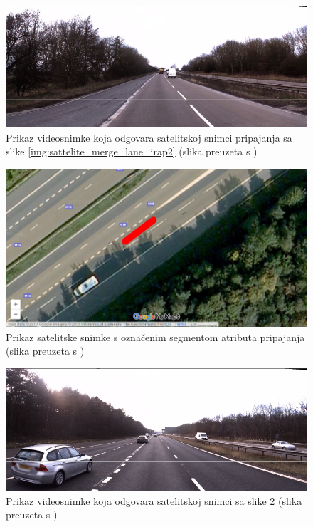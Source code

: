 \documentclass[times, utf8, diplomski, numeric]{fer}
\begin{document}
\begin{figure}[H]
\centering
\includegraphics[scale=0.5]{images/video_merge_lane_irap2.png}
\caption{Prikaz videosnimke koja odgovara satelitskoj snimci pripajanja sa slike \ref{img:sattelite_merge_lane_irap2} (slika preuzeta s \citep{url:ftts_irap})}
\label{img:video_merge_lane_irap2}
\end{figure}

\begin{figure}[H]
\centering
\includegraphics[scale=0.35]{images/sattelite_merge_lane_irap3.png}
\caption{Prikaz satelitske snimke s označenim segmentom atributa pripajanja (slika preuzeta s \citep{url:google_maps})}
\label{img:sattelite_merge_lane_irap3}
\end{figure}

\begin{figure}[H]
\centering
\includegraphics[scale=0.5]{images/video_merge_lane_irap3.png}
\caption{Prikaz videosnimke koja odgovara satelitskoj snimci sa slike \ref{img:sattelite_merge_lane_irap3} (slika preuzeta s \citep{url:ftts_irap})}
\label{img:video_merge_lane_irap3}
\end{figure}
\end{document}
